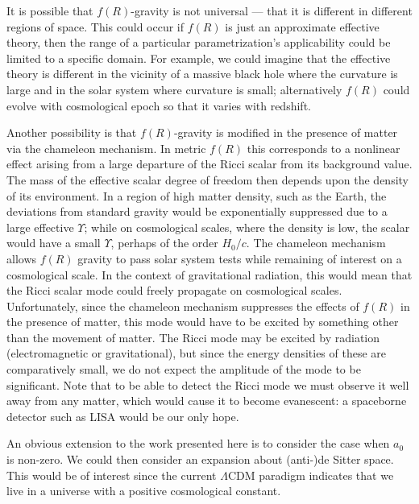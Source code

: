 It is possible that $f(R)$-gravity is not universal --- that it is different in different regions of space. This could occur if $f(R)$ is just an approximate effective theory, then the range of a particular parametrization's applicability could be limited to a specific domain. For example, we could imagine that the effective theory is different in the vicinity of a massive black hole where the curvature is large and in the solar system where curvature is small; alternatively $f(R)$ could evolve with cosmological epoch so that it varies with redshift.

Another possibility is that $f(R)$-gravity is modified in the presence of matter via the chameleon mechanism\cite{Khoury2004, Khoury2004a}. In metric $f(R)$ this corresponds to a nonlinear effect arising from a large departure of the Ricci scalar from its background value\cite{DeFelice2010}. The mass of the effective scalar degree of freedom then depends upon the density of its environment. In a region of high matter density, such as the Earth, the deviations from standard gravity would be exponentially suppressed due to a large effective $\Upsilon$; while on cosmological scales, where the density is low, the scalar would have a small $\Upsilon$, perhaps of the order $H_0/c$\cite{Khoury2004, Khoury2004a}. The chameleon mechanism allows $f(R)$ gravity to pass solar system tests while remaining of interest on a cosmological scale. In the context of gravitational radiation, this would mean that the Ricci scalar mode could freely propagate on cosmological scales. Unfortunately, since the chameleon mechanism suppresses the effects of $f(R)$ in the presence of matter, this mode would have to be excited by something other than the movement of matter. The Ricci mode may be excited by radiation (electromagnetic or gravitational), but since the energy densities of these are comparatively small, we do not expect the amplitude of the mode to be significant. Note that to be able to detect the Ricci mode we must observe it well away from any matter, which would cause it to become evanescent: a spaceborne detector such as LISA would be our only hope.

An obvious extension to the work presented here is to consider the case when $a_0$ is non-zero. We could then consider an expansion about (anti-)de Sitter space. This would be of interest since the current $\Lambda$CDM paradigm indicates that we live in a universe with a positive cosmological constant\cite{Hinshaw2009}. 
